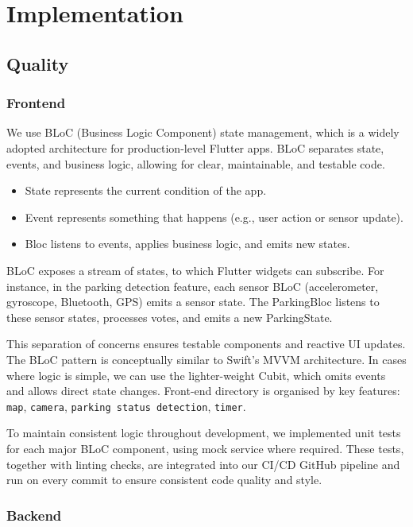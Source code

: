 \section{Implementation}

\subsection{Quality}

\subsubsection{Frontend}

We use BLoC (Business Logic Component) state management, which is a widely adopted architecture for production-level Flutter apps. BLoC separates state, events, and business logic, allowing for clear, maintainable, and testable code.
\begin{itemize}
    \item State represents the current condition of the app.
    \item Event represents something that happens (e.g., user action or sensor update).
    \item Bloc listens to events, applies business logic, and emits new states.
\end{itemize}

BLoC exposes a stream of states, to which Flutter widgets can subscribe. For instance, in the parking detection feature, each sensor BLoC (accelerometer, gyroscope, Bluetooth, GPS) emits a sensor state. The ParkingBloc listens to these sensor states, processes votes, and emits a new ParkingState.

This separation of concerns ensures testable components and reactive UI updates. The BLoC pattern is conceptually similar to Swift’s MVVM architecture. In cases where logic is simple, we can use the lighter-weight Cubit, which omits events and allows direct state changes. Front-end directory is organised by key features: \texttt{map}, \texttt{camera}, \texttt{parking status detection}, \texttt{timer}.

To maintain consistent logic throughout development, we implemented unit tests for each major BLoC component, using mock service where required. These tests, together with linting checks, are integrated into our CI/CD GitHub pipeline and run on every commit to ensure consistent code quality and style.

\subsubsection{Backend}

